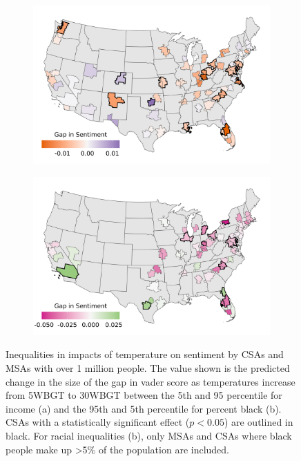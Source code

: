 \documentclass{article}
\begin{document}
\begin{figure}[H]
\centering
\begin{subfigure}{0.75\textwidth}
  \includegraphics[width=\linewidth]{../res/map_wbgt_income.png}
  \caption{}
  \label{fig:map1}
\end{subfigure}
\begin{subfigure}{0.75\textwidth}
  \includegraphics[width=\linewidth]{../res/map_wbgt_black.png}
  \caption{}
  \label{fig:map2}
\end{subfigure}
\caption{Inequalities in impacts of temperature on sentiment by CSAs and MSAs with over 1 million people.  The value shown is the predicted change in the size of the gap in vader score as temperatures increase from 5WBGT to 30WBGT between the 5th and 95 percentile for income (a) and the 95th and 5th percentile for percent black (b).  CSAs with a statistically significant effect ($p < 0.05$) are outlined in black.  For racial inequalities (b), only MSAs and CSAs where black people make up >5\% of the population are included.}
\label{fig:test}
\end{figure}
\end{document}
